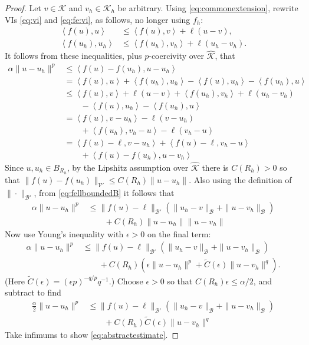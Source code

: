 \documentclass[hidelinks,onefignum,onetabnum,final]{siamart220329}  %
\newcommand{\eps}{\epsilon}
\newcommand{\cB}{\mathcal{B}}
\newcommand{\cK}{\mathcal{K}}
\newcommand{\cV}{\mathcal{V}}
\newcommand{\hcK}{\widehat{\cK}}
\newcommand{\ip}[2]{\left<#1,#2\right>}
\begin{document}
\begin{proof}  Let $v\in\cK$ and $v_h\in\cK_h$ be arbitrary.  Using \eqref{eq:commonextension}, rewrite VIs \eqref{eq:vi} and \eqref{eq:fe:vi}, as follows, no longer using $f_h$:
\begin{align*}
\ip{f(u)}{u}     &\le \ip{f(u)}{v} + \ell(u-v),  \\
\ip{f(u_h)}{u_h} &\le \ip{f(u_h)}{v_h} + \ell(u_h-v_h).
\end{align*}
It follows from these inequalities, plus $p$-coercivity over $\hcK$, that
\begin{align*}
\alpha \|u-u_h\|^p &\le \ip{f(u)-f(u_h)}{u-u_h} \\
  &= \ip{f(u)}{u} + \ip{f(u_h)}{u_h} - \ip{f(u)}{u_h} - \ip{f(u_h)}{u} \\
  &\le \ip{f(u)}{v} + \ell(u-v) + \ip{f(u_h)}{v_h} + \ell(u_h-v_h) \\
  &\qquad - \ip{f(u)}{u_h} - \ip{f(u_h)}{u} \\
  &= \ip{f(u)}{v-u_h} - \ell(v-u_h) \\
  &\qquad + \ip{f(u_h)}{v_h-u} - \ell(v_h-u) \\
  &= \ip{f(u)-\ell}{v-u_h} + \ip{f(u)-\ell}{v_h-u} \\
  &\qquad + \ip{f(u)-f(u_h)}{u-v_h}
\end{align*}
Since $u,u_h\in B_{R_h}$, by the Lipshitz assumption over $\hcK$ there is $C(R_h)>0$ so that $\|f(u)-f(u_h)\|_{\cV'} \le C(R_h) \|u-u_h\|$.  Also using the definition of $\|\cdot\|_{\cB'}$, from \eqref{eq:fellboundedB} it follows that
\begin{align*}
\alpha \|u-u_h\|^p &\le \|f(u)-\ell\|_{\cB'} \left(\|u_h-v\|_{\cB} + \|u-v_h\|_{\cB}\right) \\
  &\qquad + C(R_h) \|u-u_h\| \|u-v_h\|
\end{align*}
Now use Young's inequality with $\eps>0$ \cite[Appendix B.2]{Evans2010} on the final term:
\begin{align*}
\alpha \|u-u_h\|^p &\le \|f(u)-\ell\|_{\cB'} \left(\|u_h-v\|_{\cB} + \|u-v_h\|_{\cB}\right) \\
  &\qquad + C(R_h) \left(\eps\|u-u_h\|^p + \tilde C(\eps) \|u-v_h\|^q\right).
\end{align*}
(Here $\tilde C(\eps) = (\eps p)^{-q/p} q^{-1}$.)  Choose $\eps>0$ so that $C(R_h) \eps \le \alpha/2$, and subtract to find
\begin{align*}
\frac{\alpha}{2} \|u-u_h\|^p &\le \|f(u)-\ell\|_{\cB'} \left(\|u_h-v\|_{\cB} + \|u-v_h\|_{\cB}\right) \\
  &\qquad + C(R_h) \tilde C(\eps) \|u-v_h\|^q
\end{align*}
Take infimums to show \eqref{eq:abstractestimate}.
\end{proof}
\end{document}
